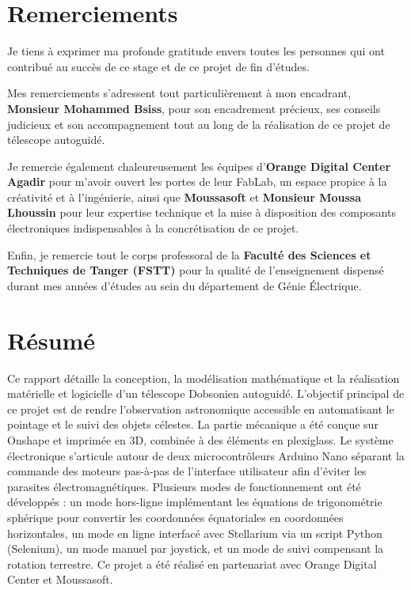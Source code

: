 \documentclass[12pt,a4paper]{report}
\begin{document}
\clearpage

\chapter*{Remerciements}
Je tiens à exprimer ma profonde gratitude envers toutes les personnes qui ont contribué au succès de ce stage et de ce projet de fin d'études.

Mes remerciements s'adressent tout particulièrement à mon encadrant, \textbf{Monsieur Mohammed Bsiss}, pour son encadrement précieux, ses conseils judicieux et son accompagnement tout au long de la réalisation de ce projet de télescope autoguidé. 

Je remercie également chaleureusement les équipes d'\textbf{Orange Digital Center Agadir} pour m'avoir ouvert les portes de leur FabLab, un espace propice à la créativité et à l'ingénierie, ainsi que \textbf{Moussasoft} et \textbf{Monsieur Moussa Lhoussin} pour leur expertise technique et la mise à disposition des composants électroniques indispensables à la concrétisation de ce projet.

Enfin, je remercie tout le corps professoral de la \textbf{Faculté des Sciences et Techniques de Tanger (FSTT)} pour la qualité de l'enseignement dispensé durant mes années d'études au sein du département de Génie Électrique.

\clearpage

\chapter*{Résumé}
Ce rapport détaille la conception, la modélisation mathématique et la réalisation matérielle et logicielle d'un télescope Dobsonien autoguidé. L'objectif principal de ce projet est de rendre l'observation astronomique accessible en automatisant le pointage et le suivi des objets célestes. La partie mécanique a été conçue sur Onshape et imprimée en 3D, combinée à des éléments en plexiglass. Le système électronique s'articule autour de deux microcontrôleurs Arduino Nano séparant la commande des moteurs pas-à-pas de l'interface utilisateur afin d'éviter les parasites électromagnétiques. 
Plusieurs modes de fonctionnement ont été développés : un mode hors-ligne implémentant les équations de trigonométrie sphérique pour convertir les coordonnées équatoriales en coordonnées horizontales, un mode en ligne interfacé avec Stellarium via un script Python (Selenium), un mode manuel par joystick, et un mode de suivi compensant la rotation terrestre. Ce projet a été réalisé en partenariat avec Orange Digital Center et Moussasoft.
\end{document}
